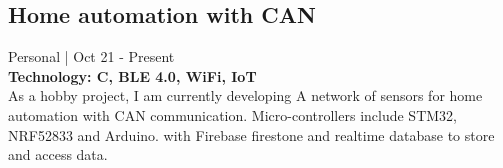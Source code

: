\documentclass[]{Abhijoshi}
\begin{document}
\begin{minipage}[t]{0.49\textwidth}
\subsection{H\MakeLowercase{ome Automation with} CAN}
Personal | Oct 21 - Present \\
\vspace{0.5mm}
\textbf{Technology: C, BLE 4.0, WiFi, IoT}\\
\vspace{0.5mm}
As a hobby project, I am currently developing A
network of sensors for home automation with CAN
communication. Micro-controllers include STM32,
NRF52833 and Arduino. with Firebase firestone and realtime database to store and access data. 

\end{minipage} 
\end{document}
